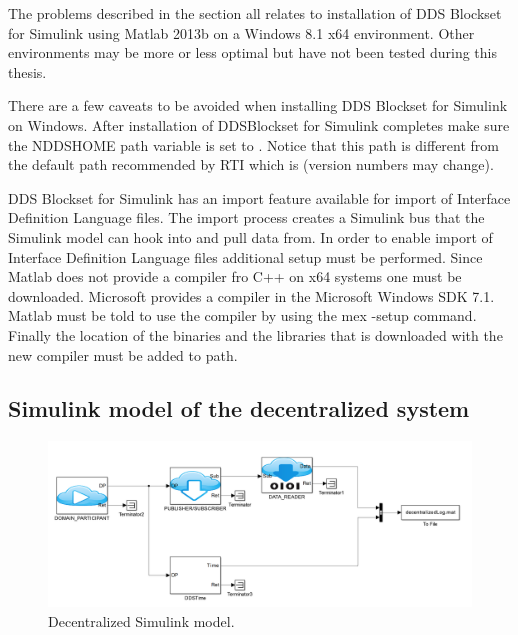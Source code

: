 The problems described in the section all relates to installation of DDS Blockset for Simulink using Matlab 2013b on a Windows 8.1 x64 environment.
Other environments may be more or less optimal but have not been tested during this thesis.

There are a few caveats to be avoided when installing DDS Blockset for Simulink on Windows.
After installation of DDSBlockset for Simulink completes make sure the NDDSHOME path variable is set to .
Notice that this path is different from the default path recommended by RTI which is  (version numbers may change).

DDS Blockset for Simulink has an import feature available for import of Interface Definition Language files. The import process creates a Simulink bus that the Simulink model can hook into and pull data from. In order to enable import of Interface Definition Language files additional setup must be performed.
Since Matlab does not provide a compiler fro C++ on x64 systems one must be downloaded. Microsoft provides a compiler in the Microsoft Windows SDK 7.1. Matlab must be told to use the compiler by using the mex -setup command. Finally the location of the binaries and the libraries that is downloaded with the new compiler must be added to path.

\subsection{Simulink model of the decentralized system}\label{subsec:decentralizedmodel}

\begin{figure}[b]
\includegraphics[width=\textwidth]{figures/DecentralizedModel}
	\caption[Decentralized Simulink model]{
		\label{fig:decentralizedSimulinkModel} 
		\footnotesize{%
			Decentralized Simulink model.
		}
	}
\end{figure}

